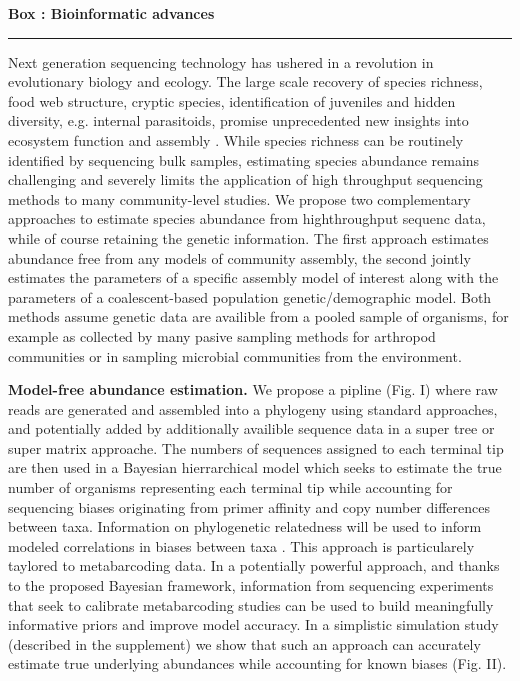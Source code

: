 \documentclass[12pt]{article}
\newcounter{Box}
\begin{document}
\noindent
\colorbox{gray!20}{
  \begin{minipage}{0.97\textwidth}
    \label{box:lab}
    \noindent
    {\bf \large Box \theBox: Bioinformatic advances} 
    \vspace{1pt}
    \hrule
    \vspace{1pt}

    Next generation sequencing technology has ushered in a revolution
    in evolutionary biology and ecology. The large scale recovery of
    species richness, food web structure, cryptic species,
    identification of juveniles and hidden diversity, e.g. internal
    parasitoids, promise unprecedented new insights into ecosystem
    function and assembly \citep[see Box
    \ref{box:wet};][]{krehenwinkel2016, shokralla2015, gibson2014,
      taberlet2012}. While species richness can be routinely
    identified by sequencing bulk samples, estimating species
    abundance remains challenging \citep{elbrecht2015} and severely
    limits the application of high throughput sequencing methods to
    many community-level studies. We propose two complementary
    approaches to estimate species abundance from highthroughput
    sequenc data, while of course retaining the genetic information.
    The first approach estimates abundance free from any models of
    community assembly, the second jointly estimates the parameters of
    a specific assembly model of interest along with the parameters of
    a coalescent-based population genetic/demographic model.  Both
    methods assume genetic data are availible from a pooled sample of
    organisms, for example as collected by many pasive sampling
    methods for arthropod communities or in sampling microbial
    communities from the environment.

    {\bf Model-free abundance estimation.} We propose a pipline
    (Fig. I) where raw reads are generated and assembled into a
    phylogeny using standard approaches, and potentially added by
    additionally availible sequence data in a super tree or super
    matrix approache. The numbers of sequences assigned to each
    terminal tip are then used in a Bayesian hierrarchical model which
    seeks to estimate the true number of organisms representing each
    terminal tip while accounting for sequencing biases originating
    from primer affinity and copy number differences between taxa.
    Information on phylogenetic relatedness will be used to inform
    modeled correlations in biases between taxa \citep[e.g. copy
    number is known to be phylogenetically conserved]{foo}. This
    approach is particularely taylored to metabarcoding data. In a
    potentially powerful approach, and thanks to the proposed Bayesian
    framework, information from sequencing experiments that seek to
    calibrate metabarcoding studies \citep[e.g.,][]{henrik} can be
    used to build meaningfully informative priors and improve model
    accuracy. In a simplistic simulation study (described in the
    supplement) we show that such an approach can accurately estimate
    true underlying abundances while accounting for known biases
    (Fig. II).


\end{minipage}}
\end{document}
